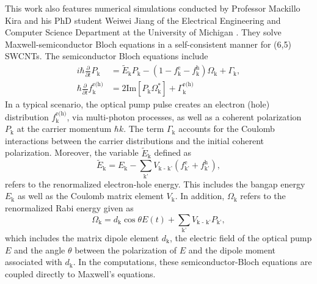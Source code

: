 This work also features numerical simulations conducted by Professor Mackillo Kira and his PhD student Weiwei Jiang of the Electrical Engineering and Computer Science Department at the University of Michigan \cite{mack2019}. They solve Maxwell-semiconductor Bloch equations \cite{kira2011semiconductor, hirtschulz2008carbon} in a self-consistent manner for (6,5) SWCNTs. The semiconductor Bloch equations include
%
\begin{equation}
	\begin{split}
	i \hbar \frac{\partial}{\partial t} P_\text{k} &= \tilde{E}_\text{k} P_\text{k} - ( 1- f^\text{e}_\text{k} - f^\text{h}_\text{k})\Omega_\text{k} + \Gamma_\text{k}, \\
	\hbar \frac{\partial }{\partial t} f_\text{k}^\text{e(h)} &= 2 \text{Im}[P_\text{k}\Omega_\text{k}^*] + \Gamma^\text{e(h)}_\text{k}
	\end{split}
\end{equation}
%
 In a typical scenario, the optical pump pulse creates an electron (hole) distribution $f_\text{k}^\text{e(h)}$, via multi-photon processes, as well as a coherent polarization $P_\text{k}$ at the carrier momentum $\hbar k$. The term $\Gamma_\text{k}$ accounts for the Coulomb interactions between the carrier distributions and the initial coherent polarization. Moreover, the variable $\tilde{E}_\text{k}$ defined as
%
\begin{equation}
	\tilde{E}_\text{k} = E_\text{k} - \sum_\text{k'} V_\text{k - k'} ( f_\text{k'}^\text{e} + f_\text{k'}^\text{h}),
\end{equation}
%
refers to the renormalized electron-hole energy. This includes the bangap energy $E_\text{k}$ as well as the Coulomb matrix element $V_\text{k}$. In addition, $\Omega_\text{k}$ refers to the renormalized Rabi energy given as
\begin{equation}
	\Omega_\text{k} = d_\text{k} \cos\theta E(t) + \sum_\text{k'} V_\text{k - k'} P_\text{k'},
\end{equation}
which includes the matrix dipole element $d_\text{k}$, the electric field of the optical pump $E$ and the angle $\theta$ between the polarization of $E$ and the dipole moment associated with $d_\text{k}$. In the computations, these semiconductor-Bloch equations are coupled directly to Maxwell's equations.


